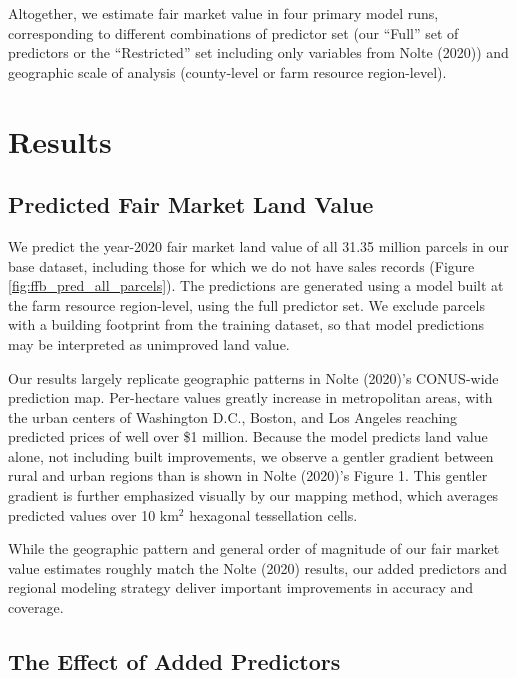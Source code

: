 \documentclass[12pt]{article}
\begin{document}
Altogether, we estimate fair market value in four primary model runs, corresponding to different combinations of predictor set (our ``Full'' set of predictors or the ``Restricted'' set including only variables from Nolte (2020)) and geographic scale of analysis (county-level or farm resource region-level). 

\section{Results}

\subsection{Predicted Fair Market Land Value}

We predict the year-2020 fair market land value of all 31.35 million parcels in our base dataset, including those for which we do not have sales records (Figure \ref{fig:ffb_pred_all_parcels}). The predictions are generated using a model built at the farm resource region-level, using the full predictor set. We exclude parcels with a building footprint from the training dataset, so that model predictions may be interpreted as unimproved land value.

Our results largely replicate geographic patterns in Nolte (2020)'s CONUS-wide prediction map. Per-hectare values greatly increase in metropolitan areas, with the urban centers of Washington D.C., Boston, and Los Angeles reaching predicted prices of well over \$1 million. Because the model predicts land value alone, not including built improvements, we observe a gentler gradient between rural and urban regions than is shown in Nolte (2020)'s Figure 1. This gentler gradient is further emphasized visually by our mapping method, which averages predicted values over 10 km$^2$ hexagonal tessellation cells. 

While the geographic pattern and general order of magnitude of our fair market value estimates roughly match the Nolte (2020) results, our added predictors and regional modeling strategy deliver important improvements in accuracy and coverage. 

\subsection{The Effect of Added Predictors}
\end{document}
